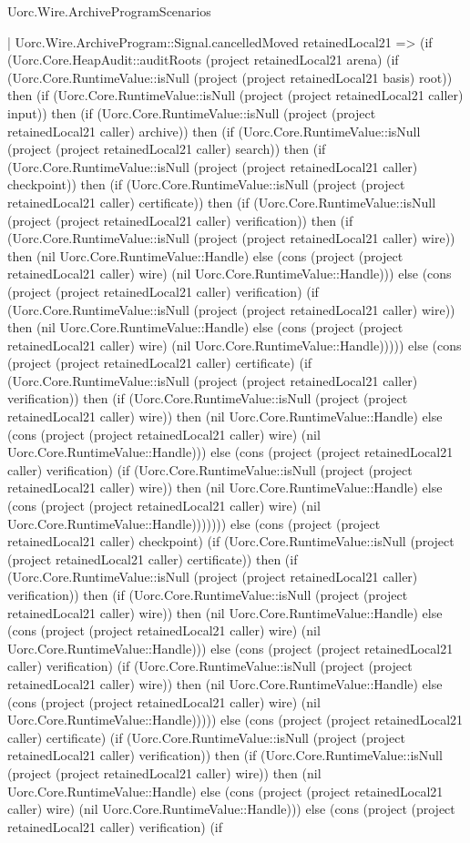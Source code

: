 \begin{lexlean}{Uorc.Wire.ArchiveProgramScenarios}
\begin{semanticmodule}
{      | Uorc.Wire.ArchiveProgram::Signal.cancelledMoved retainedLocal21 => (if (Uorc.Core.HeapAudit::auditRoots (project retainedLocal21 arena) (if (Uorc.Core.RuntimeValue::isNull (project (project retainedLocal21 basis) root)) then (if (Uorc.Core.RuntimeValue::isNull (project (project retainedLocal21 caller) input)) then (if (Uorc.Core.RuntimeValue::isNull (project (project retainedLocal21 caller) archive)) then (if (Uorc.Core.RuntimeValue::isNull (project (project retainedLocal21 caller) search)) then (if (Uorc.Core.RuntimeValue::isNull (project (project retainedLocal21 caller) checkpoint)) then (if (Uorc.Core.RuntimeValue::isNull (project (project retainedLocal21 caller) certificate)) then (if (Uorc.Core.RuntimeValue::isNull (project (project retainedLocal21 caller) verification)) then (if (Uorc.Core.RuntimeValue::isNull (project (project retainedLocal21 caller) wire)) then (nil Uorc.Core.RuntimeValue::Handle) else (cons (project (project retainedLocal21 caller) wire) (nil Uorc.Core.RuntimeValue::Handle))) else (cons (project (project retainedLocal21 caller) verification) (if (Uorc.Core.RuntimeValue::isNull (project (project retainedLocal21 caller) wire)) then (nil Uorc.Core.RuntimeValue::Handle) else (cons (project (project retainedLocal21 caller) wire) (nil Uorc.Core.RuntimeValue::Handle))))) else (cons (project (project retainedLocal21 caller) certificate) (if (Uorc.Core.RuntimeValue::isNull (project (project retainedLocal21 caller) verification)) then (if (Uorc.Core.RuntimeValue::isNull (project (project retainedLocal21 caller) wire)) then (nil Uorc.Core.RuntimeValue::Handle) else (cons (project (project retainedLocal21 caller) wire) (nil Uorc.Core.RuntimeValue::Handle))) else (cons (project (project retainedLocal21 caller) verification) (if (Uorc.Core.RuntimeValue::isNull (project (project retainedLocal21 caller) wire)) then (nil Uorc.Core.RuntimeValue::Handle) else (cons (project (project retainedLocal21 caller) wire) (nil Uorc.Core.RuntimeValue::Handle))))))) else (cons (project (project retainedLocal21 caller) checkpoint) (if (Uorc.Core.RuntimeValue::isNull (project (project retainedLocal21 caller) certificate)) then (if (Uorc.Core.RuntimeValue::isNull (project (project retainedLocal21 caller) verification)) then (if (Uorc.Core.RuntimeValue::isNull (project (project retainedLocal21 caller) wire)) then (nil Uorc.Core.RuntimeValue::Handle) else (cons (project (project retainedLocal21 caller) wire) (nil Uorc.Core.RuntimeValue::Handle))) else (cons (project (project retainedLocal21 caller) verification) (if (Uorc.Core.RuntimeValue::isNull (project (project retainedLocal21 caller) wire)) then (nil Uorc.Core.RuntimeValue::Handle) else (cons (project (project retainedLocal21 caller) wire) (nil Uorc.Core.RuntimeValue::Handle))))) else (cons (project (project retainedLocal21 caller) certificate) (if (Uorc.Core.RuntimeValue::isNull (project (project retainedLocal21 caller) verification)) then (if (Uorc.Core.RuntimeValue::isNull (project (project retainedLocal21 caller) wire)) then (nil Uorc.Core.RuntimeValue::Handle) else (cons (project (project retainedLocal21 caller) wire) (nil Uorc.Core.RuntimeValue::Handle))) else (cons (project (project retainedLocal21 caller) verification) (if }
\end{semanticmodule}
\end{lexlean}
